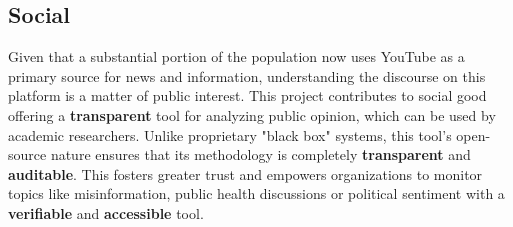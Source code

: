 \subsection{Social}

Given that a substantial portion of the population now uses YouTube as a primary source for news and information, understanding the discourse on this platform is a matter of public interest. This project contributes to social good offering a \textbf{transparent} tool for analyzing public opinion, which can be used by academic researchers. Unlike proprietary "black box" systems, this tool's open-source nature ensures that its methodology is completely \textbf{transparent} and \textbf{auditable}. This fosters greater trust and empowers organizations to monitor topics like misinformation, public health discussions or political sentiment with a \textbf{verifiable} and \textbf{accessible} tool.
